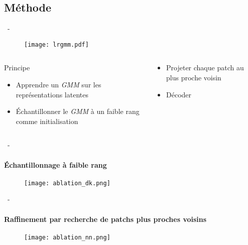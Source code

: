 \documentclass[aspectratio=169, 22pt]{beamer}
\begin{document}
\subsection{Méthode}
\begin{frame}{\secname~- \subsecname}
  \begin{figure}
    \texttt{[image: lrgmm.pdf]}
  \end{figure}
  \begin{columns}
    \begin{column}{0.5\linewidth}
      \begin{exampleblock}{Principe}
        \begin{itemize}
        \item \small Apprendre un \emph{GMM} sur les représentations latentes
        \item \small Échantillonner le \emph{GMM} à un faible rang comme initialisation
        \end{itemize}
      \end{exampleblock}
    \end{column}
    \begin{column}{0.5\linewidth}
        \begin{exampleblock}{}
        \begin{itemize}
        \item \small Projeter chaque patch au plus proche voisin
        \item \small Décoder
        \end{itemize}
      \end{exampleblock}
    \end{column}
  \end{columns}
  
\end{frame}

\begin{frame}{\secname~- \subsecname}
  \framesubtitle{Échantillonnage à faible rang} 
  \begin{figure}
    \texttt{[image: ablation\_dk.png]}
  \end{figure}  
\end{frame}

\begin{frame}{\secname~- \subsecname}
  \framesubtitle{Raffinement par recherche de patchs plus proches voisins}
  \begin{figure}
    \texttt{[image: ablation\_nn.png]}
  \end{figure}    
\end{frame}
\end{document}
